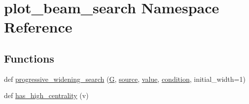 \hypertarget{namespaceplot__beam__search}{}\section{plot\+\_\+beam\+\_\+search Namespace Reference}
\label{namespaceplot__beam__search}
\subsection*{Functions}
\begin{DoxyCompactItemize}
\item 
def \hyperlink{namespaceplot__beam__search_a0a30e40d2760d912c16dc2d13f2090df}{progressive\+\_\+widening\+\_\+search} (\hyperlink{namespaceplot__beam__search_a10893bc053b99c5aa8a4a19ae98104a0}{G}, \hyperlink{namespaceplot__beam__search_a214105633466006a101573ac80d34b35}{source}, \hyperlink{namespaceplot__beam__search_a989923cc074314f9dad692411af51033}{value}, \hyperlink{namespaceplot__beam__search_aadefc81469153d44cac9a5b2371d7fb9}{condition}, initial\+\_\+width=1)
\item 
def \hyperlink{namespaceplot__beam__search_a0ee3c919d7b8ed3b289e043ad45a8379}{has\+\_\+high\+\_\+centrality} (v)
\end{DoxyCompactItemize}
